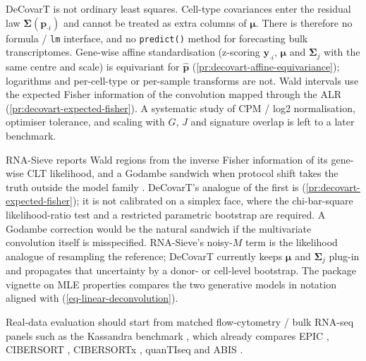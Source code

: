 \documentclass[pdflatex, sn-nature]{sn-jnl}
\theoremstyle{thmstyleone}%
\theoremstyle{thmstyletwo}%
\theoremstyle{thmstylethree}%
\begin{document}
    DeCovarT is not ordinary least squares. Cell-type covariances enter the
    residual law \(\boldsymbol{\Sigma}(\boldsymbol{p}_{\cdot i})\) and cannot be
    treated as extra columns of \(\boldsymbol{\mu}\). There is therefore no
    formula / \texttt{lm} interface, and no \texttt{predict()} method for
    forecasting bulk transcriptomes. Gene-wise affine standardisation
    (z-scoring \(\boldsymbol{y}_{\cdot i}\), \(\boldsymbol{\mu}\) and
    \(\boldsymbol{\Sigma}_{j}\) with the same centre and scale) is equivariant
    for \(\hat{\boldsymbol{p}}\)
    (\ref{pr:decovart-affine-equivariance}); logarithms and
    per-cell-type or per-sample transforms are not. Wald intervals use the
    expected Fisher information of the convolution mapped through the ALR
    (\ref{pr:decovart-expected-fisher}). A systematic study of CPM / log2
    normalisation, optimiser tolerance, and scaling with \(G\), \(J\) and
    signature overlap is left to a later benchmark.

    RNA-Sieve reports Wald regions from the inverse Fisher information of
    its gene-wise CLT likelihood, and a Godambe sandwich when protocol
    shift takes the truth outside the model family
    \cite{erdmann-phamLikelihoodbasedDeconvolutionBulk2021}. DeCovarT's
    analogue of the first is
    (\ref{pr:decovart-expected-fisher}); it is not calibrated on a simplex
    face, where the chi-bar-square likelihood-ratio test and a restricted
    parametric bootstrap are required. A Godambe correction would be the
    natural sandwich if the multivariate convolution itself is
    misspecified. RNA-Sieve's noisy-$M$ term is the likelihood analogue of
    resampling the reference; DeCovarT currently keeps
    $\boldsymbol{\mu}$ and $\boldsymbol{\Sigma}_{j}$ plug-in and
    propagates that uncertainty by a donor- or cell-level bootstrap. The
    package vignette on MLE properties compares the two generative models
    in notation aligned with (\ref{eq-linear-deconvolution}).

    Real-data evaluation should start from matched flow-cytometry / bulk
    RNA-seq panels such as the Kassandra benchmark
    \cite{zaitsevPreciseReconstructionTME2022}, which already compares EPIC
    \cite{racleSimultaneousEnumerationCancer2017}, CIBERSORT
    \cite{newmanRobustEnumerationCell2015}, CIBERSORTx
    \cite{newmanDeterminingCellType2019}, quanTIseq \cite{finotello_etal19}
    and ABIS \cite{monacoRNASeqSignaturesNormalized2019}.
\end{document}
